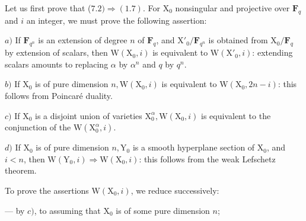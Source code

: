 \documentclass[10pt,leqno]{article}
\begin{document}
\endgroup

\label{physical-30}

\noindent Let us first prove that (\(7.2)\Rightarrow (1.7)\). For \(\mathrm{X}_{0}\) nonsingular and projective over \(\mathbf{F}_{q}\) and \(i\) an integer, we must prove the following assertion:\par

\par

\noindent \(a)\) If \(\mathbf{F}_{q^{n}}\) is an extension of degree \(n\) of \(\mathbf{F}_{q}\), and \(\mathrm{X}'_{0}/\mathbf{F}_{q^{n}}\) is obtained from \(\mathrm{X}_{0}/\mathbf{F}_{q}\) by extension of scalars, then \(\mathrm{W}(\mathrm{X}_{0},i)\) is equivalent to \(\mathrm{W}(\mathrm{X}'_{0},i)\): extending scalars amounts to replacing \(\alpha \) by \(\alpha ^{n}\) and \(q\) by \(q^{n}\).\par

\noindent \(b)\) If \(\mathrm{X}_{0}\) is of pure dimension \(n, \mathrm{W}(\mathrm{X}_{0},i)\) is equivalent to \(\mathrm{W}(\mathrm{X}_{0},2n- i)\): this follows from Poincaré duality.\par

\noindent \(c)\) If \(\mathrm{X}_{0}\) is a disjoint union of varieties \(\mathrm{X}_{0}^{\alpha }, \mathrm{W}(\mathrm{X}_{0},i)\) is equivalent to the conjunction of the \(\mathrm{W}(\mathrm{X}_{0}^{\alpha },i)\).\par

\noindent \(d)\) If \(\mathrm{X}_{0}\) is of pure dimension \(n, \mathrm{Y}_{0}\) is a smooth hyperplane section of \(\mathrm{X}_{0}\), and \(i<n\), then \(\mathrm{W}(\mathrm{Y}_{0},i)\Rightarrow \mathrm{W}(\mathrm{X}_{0},i)\): this follows from the weak Lefschetz theorem.\par

\noindent To prove the assertions \(\mathrm{W}(\mathrm{X}_{0},i)\), we reduce successively:\par

\noindent — by \(c)\), to assuming that \(\mathrm{X}_{0}\) is of some pure dimension \(n\);\par
\end{document}
